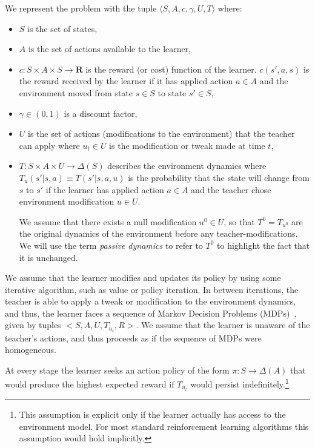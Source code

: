 We represent  the problem with the tuple  $\langle S, A, c,\gamma, U,T\rangle$ where:
\begin{itemize}
\item $S$ is the set of states, 
\item $A$ is the set of actions available to the learner,
\item  $c:S\times A\times S\rightarrow\mathbf{R}$ is the reward (or
  cost) function of the learner. $c(s',a,s)$ is the reward received by
  the learner if it has applied action $a\in A$ and the environment
  moved from state $s\in S$ to state $s'\in S$,
\item $\gamma \in (0,1)$ is a discount factor,   

\item $U$ is the set of actions (modifications to the environment)
  that the teacher can apply where $u_t\in U$ is the modification or tweak made
  at time $t$,

\item $T:S\times A\times U\rightarrow\Delta(S)$ describes the
  environment dynamics where $T_u(s'|s,a)\equiv T(s'|s,a,u)$ is the
  probability that the state will change from $s$ to $s'$ if the
  learner has applied action $a\in A$ and the teacher chose
  environment modification $u\in U$.

We assume that there exists a null modification $u^0\in U$, so that
$T^0=T_{u^0}$  are the original dynamics of the environment before any teacher-modifications. We will use the term \emph{passive dynamics} to refer to $T^0$ to highlight the fact that it is unchanged.

\end{itemize}

We assume that the learner modifies and updates its policy by using some iterative algorithm, such 
as value or policy iteration.  In between iterations, the teacher is able to apply a tweak or 
modification to the environment dynamics, and thus, the learner faces 
 a sequence of Markov Decision Problems (MDPs)~\cite{puterman_book_94},
 given by tuples $<S,A,U,T_{u_t},R>$. We assume that the learner is unaware of the teacher's  
 actions, and thus proceeds as if the sequence of MDPs were homogeneous.
 
 
\begin{assume}\label{assume_persistence}
At every
stage the learner seeks an action policy of the form
$\pi:S\rightarrow\Delta(A)$ that would produce the highest expected
reward if $T_{u_t}$ would persist indefinitely.\footnote{This 
  assumption is explicit only if the learner actually has access to
  the environment model. For most standard reinforcement learning algorithms this
  assumption would hold implicitly.}
\end{assume}


